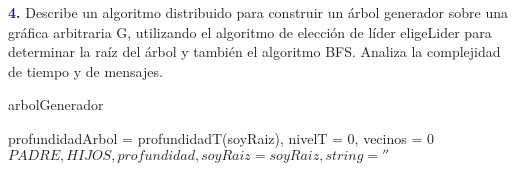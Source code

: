 \newpage
\textbf{\textcolor{MidnightBlue}{4.}}
Describe un algoritmo distribuido para construir un árbol generador sobre una gráfica
arbitraria G, utilizando el algoritmo de elección de líder eligeLider para determinar la raíz del
árbol y también el algoritmo BFS. Analiza la complejidad de tiempo y de mensajes.

\begin{algorithm}
\caption{arbolGenerador}\label{alg:cap}
\begin{algorithmic}[1]
\State profundidadArbol = profundidadT(soyRaiz), nivelT = 0, vecinos = 0
\State $PADRE, HIJOS, profundidad, soyRaiz=soyRaiz, string = ''$
\end{algorithmic}
\end{algorithm}